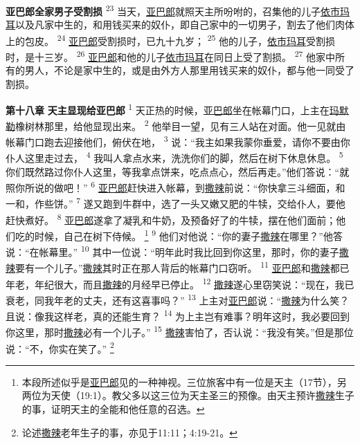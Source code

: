 \textbf{亚巴郎全家男子受割损 }
\textsuperscript{23}
当天，\uline{亚巴郎}就照天主所吩咐的，召集他的儿子\uline{依市玛耳}以及凡家中生的，和用钱买来的奴仆，即自己家中的一切男子，割去了他们肉体上的包皮。
\textsuperscript{24}
\uline{亚巴郎}受割损时，已九十九岁；
\textsuperscript{25}
他的儿子，\uline{依市玛耳}受割损时，是十三岁。
\textsuperscript{26}
\uline{亚巴郎}和他的儿子\uline{依市玛耳}在同日上受了割损。
\textsuperscript{27}
他家中所有的男人，不论是家中生的，或是由外方人那里用钱买来的奴仆，都与他一同受了割损。

\textbf{第十八章 }
\textbf{天主显现给亚巴郎 }
\textsuperscript{1}
天正热的时候，\uline{亚巴郎}坐在帐幕门口，上主在\uline{玛默勒}橡树林那里，给他显现出来。
\textsuperscript{2}
他举目一望，见有三人站在对面。他一见就由帐幕门口跑去迎接他们，俯伏在地，
\textsuperscript{3}
说：“我主如果我蒙你垂爱，请你不要由你仆人这里走过去，
\textsuperscript{4}
我叫人拿点水来，洗洗你们的脚，然后在树下休息休息。
\textsuperscript{5}
你们既然路过你仆人这里，等我拿点饼来，吃点点心，然后再走。”他们答说：“就照你所说的做吧！”
\textsuperscript{6}
\uline{亚巴郎}赶快进入帐幕，到\uline{撒辣}前说：“你快拿三斗细面，和一和，作些饼。”
\textsuperscript{7}
遂又跑到牛群中，选了一头又嫩又肥的牛犊，交给仆人，要他赶快煮好。
\textsuperscript{8}
\uline{亚巴郎}遂拿了凝乳和牛奶，及预备好了的牛犊，摆在他们面前；他们吃的时候，自己在树下侍候。
\footnote{本段所述似乎是\uline{亚巴郎}见的一种神视。三位旅客中有一位是天主（17节），另两位为天使（19:1）。教父多以这三位为天主圣三的预像。由天主预许\uline{撒辣}生子的事，证明天主的全能和他任意的召选。}
\textsuperscript{9}
他们对他说：“你的妻子\uline{撒辣}在哪里？”他答说：“在帐幕里。”
\textsuperscript{10}
其中一位说：“明年此时我比回到你这里，那时，你的妻子\uline{撒辣}要有一个儿子。”\uline{撒辣}其时正在那人背后的帐幕门口窃听。
\textsuperscript{11}
\uline{亚巴郎}和\uline{撒辣}都已年老，年纪很大，而且\uline{撒辣}的月经早已停止。
\textsuperscript{12}
\uline{撒辣}遂心里窃笑说：“现在，我已衰老，同我年老的丈夫，还有这喜事吗？”
\textsuperscript{13}
上主对\uline{亚巴郎}说：“\uline{撒辣}为什么笑？且说：像我这样老，真的还能生育？
\textsuperscript{14}
为上主岂有难事？明年这时，我必要回到你这里，那时\uline{撒辣}必有一个儿子。”
\textsuperscript{15}
\uline{撒辣}害怕了，否认说：“我没有笑。”但是那位说：“不，你实在笑了。”
\footnote{论述\uline{撒辣}老年生子的事，亦见于11:11；4:19-21。}

